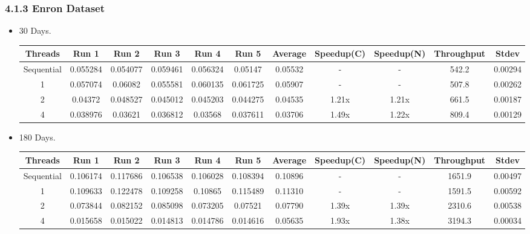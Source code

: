 \documentclass{article}
\begin{document}
\subsubsection*{4.1.3 Enron Dataset}
\begin{itemize}
    \item 30 Days.
    \begin{center}
    \begin{adjustbox}{width=\columnwidth,center}
    \begin{tabular}{||c | c c c c c | c | c c | c c ||} 
    \hline
    Threads & Run 1 & Run 2 & Run 3 & Run 4 & Run 5 & Average & Speedup(C) & Speedup(N) & Throughput & Stdev \\ [0.5ex] 
    \hline\hline
    Sequential & 0.055284 & 0.054077 & 0.059461 & 0.056324 & 0.05147 & 0.05532 & - & - & 542.2  & 0.00294\\ 
    \hline
    1 & 0.057074 & 0.06082 & 0.055581 & 0.060135 & 0.061725 & 0.05907  & - & - & 507.8 & 0.00262\\ 
    \hline
    2 & 0.04372 & 0.048527 & 0.045012 & 0.045203 & 0.044275 & 0.04535 & 1.21x & 1.21x & 661.5 & 0.00187\\ 
    \hline
    4 & 0.038976 & 0.03621 & 0.036812 & 0.03568 & 0.037611 & 0.03706 & 1.49x & 1.22x & 809.4 & 0.00129\\ 
    \hline
    \end{tabular}
    \end{adjustbox}
    \end{center}
    
    \item 180 Days.
   \begin{center}
    \begin{adjustbox}{width=\columnwidth,center}
    \begin{tabular}{||c | c c c c c | c | c c | c c ||} 
    \hline
    Threads & Run 1 & Run 2 & Run 3 & Run 4 & Run 5 & Average & Speedup(C) & Speedup(N) & Throughput & Stdev \\ [0.5ex] 
    \hline\hline
    Sequential & 0.106174 & 0.117686 & 0.106538 & 0.106028 & 0.108394 & 0.10896 & - & - & 1651.9  & 0.00497\\ 
    \hline
    1 & 0.109633 & 0.122478 & 0.109258 & 0.10865 & 0.115489 & 0.11310  & - & - & 1591.5 & 0.00592\\ 
    \hline
    2 & 0.073844 & 0.082152 & 0.085098 & 0.073205 & 0.07521 & 0.07790 & 1.39x & 1.39x & 2310.6 & 0.00538\\ 
    \hline
    4 & 0.015658 & 0.015022 & 0.014813 & 0.014786 & 0.014616 & 0.05635 & 1.93x & 1.38x & 3194.3 & 0.00034\\ 
    \hline
    \end{tabular}
    \end{adjustbox}
    \end{center}
    

\end{itemize}
\end{document}
